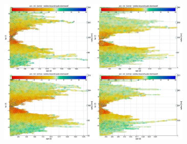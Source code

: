 \documentclass{beamer}
\begin{document}
\begin{frame}
\begin{figure}
	\centering
	\includegraphics[height=200pt,keepaspectratio=true]{scAP.pdf}
\end{figure}
\end{frame}


\begin{frame}


\end{frame}
\end{document}
